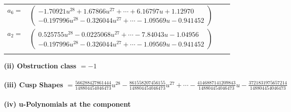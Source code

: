 \documentclass[1p]{elsarticle_modified}
\theoremstyle{definition}
\begin{document}
\begin{tabular}{m{7pt} m{180pt} m{7pt} m{180pt} }
\flushright $a_{6}=$&$\begin{pmatrix}-1.70921 u^{28}+1.67866 u^{27}+\cdots+6.16797 u+1.12970\\-0.197996 u^{28}-0.326044 u^{27}+\cdots-1.09569 u-0.941452\end{pmatrix}$ \\
\flushright $a_{2}=$&$\begin{pmatrix}0.525755 u^{28}-0.0225068 u^{27}+\cdots-7.84043 u-1.04956\\-0.197996 u^{28}-0.326044 u^{27}+\cdots-1.09569 u-0.941452\end{pmatrix}$\\&\end{tabular}
\flushleft \textbf{(ii) Obstruction class $= -1$}\\~\\
\flushleft \textbf{(iii) Cusp Shapes $= \frac{566288427861444}{148804454046473} u^{28}-\frac{861558207456155}{148804454046473} u^{27}+\cdots-\frac{4146887141209843}{148804454046473} u-\frac{3721831975657214}{148804454046473}$}\\~\\
\newpage\renewcommand{\arraystretch}{1}
\flushleft \textbf{(iv) u-Polynomials at the component}\newline \\
\end{document}
